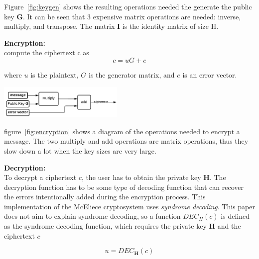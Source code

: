 \documentclass[conference]{IEEEtran}
\begin{document}
            Figure~\ref{fig:keygen} shows the resulting operations needed the generate the public key \textbf{G}. It can be seen that 3 expensive matrix operations are needed: inverse, multiply, and transpose. The matrix \textbf{I} is the identity matrix of size H.
            
            
        \textbf{Encryption:}\label{Encryption} \\
            compute the ciphertext c as
            \begin{equation} \label{eq:encryption}
                      c = uG + e
            \end{equation}
    
            where $u$ is the plaintext, $G$ is the generator matrix, and $e$ is an error vector.
        
            \begin{center}
                \includegraphics[width=0.45\textwidth]{Encryption.png}
                \label{fig:encryption}
            \end{center}        
        
            figure~\ref{fig:encryption} shows a diagram of the operations needed to encrypt a message. The two multiply and add operations are matrix operations, thus they slow down a lot when the key sizes are very large.
        
        
        \textbf{Decryption:}\label{Decryption} \\
            To decrypt a ciphertext $c$, the user has to obtain the private key \textbf{H}. The decryption function has to be some type of decoding function that can recover the errors intentionally added during the encryption process. This implementation of the McEliece cryptosystem uses \textit{syndrome decoding}. This paper does not aim to explain syndrome decoding, so a function $DEC_{H}(c)$ is defined as the syndrome decoding function, which requires the private key \textbf{H} and the ciphertext $c$

            \begin{equation} \label{eq:decryption}
                      u = DEC_{\textbf{H}}(c)
            \end{equation}
            
\end{document}

